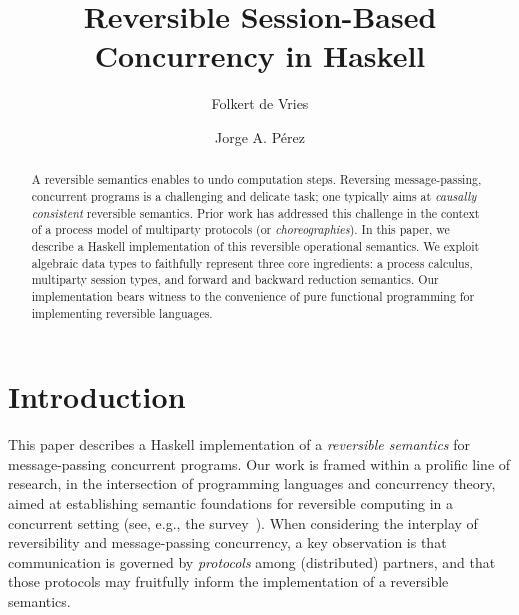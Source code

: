 \documentclass[runningheads,plain]{llncs}
\begin{document}
\title{Reversible Session-Based Concurrency in Haskell}

\author{Folkert de Vries \and
Jorge A. P\'{e}rez%
}
%
%
\maketitle



\begin{abstract}
A reversible semantics enables to undo computation steps. 
Reversing  
message-passing, concurrent programs is a
challenging and delicate task; one typically aims at
\emph{causally consistent} reversible semantics.
Prior work has addressed this
challenge in the context of a process model of multiparty protocols
(or \emph{choreographies}).
In this paper, we describe a Haskell implementation of 
this reversible operational semantics. 
We exploit algebraic data types to faithfully represent
three core ingredients: a process
calculus, multiparty session types, and forward and backward reduction semantics.
Our implementation bears witness to the convenience of pure functional programming for implementing reversible languages.
\end{abstract}





\section{Introduction}
\label{s:intro}
This paper describes a Haskell implementation of 
a \emph{reversible semantics} for message-passing concurrent programs. 
Our work is framed within a prolific line of research, 
in the intersection of programming languages and concurrency theory,
aimed at establishing  semantic foundations for reversible computing in a 
concurrent setting (see, e.g., the survey~\cite{DBLP:journals/eatcs/Lanese14}).
When considering the interplay of reversibility and message-passing concurrency, 
a key observation  is that
 communication is governed by
\emph{protocols} among  (distributed) partners, and that 
 those protocols may fruitfully inform the implementation of a reversible semantics.
\end{document}
